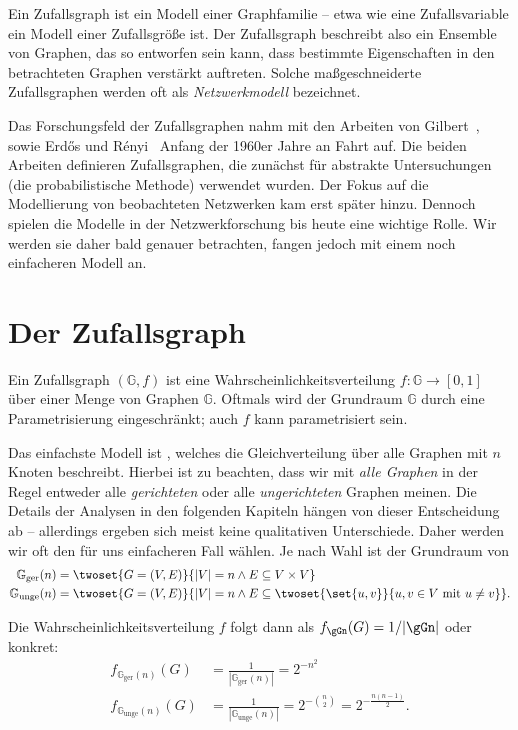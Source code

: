 Ein Zufallsgraph ist ein Modell einer Graphfamilie -- etwa wie eine Zufallsvariable ein Modell einer Zufallsgröße ist.
Der Zufallsgraph beschreibt also ein Ensemble von Graphen, das so entworfen sein kann, dass bestimmte Eigenschaften in den betrachteten Graphen verstärkt auftreten.
Solche maßgeschneiderte Zufallsgraphen werden oft als \emph{Netzwerkmodell} bezeichnet.

Das Forschungsfeld der Zufallsgraphen nahm mit den Arbeiten von Gilbert~\cite{gilbert_1959}, sowie Erd\H{o}s und R\'enyi~\cite{erdos_renyi_1960} Anfang der 1960er Jahre an Fahrt auf.
Die beiden Arbeiten definieren Zufallsgraphen, die zunächst für abstrakte Untersuchungen (\zB die probabilistische Methode) verwendet wurden.
Der Fokus auf die Modellierung von beobachteten Netzwerken kam erst später hinzu.
Dennoch spielen die Modelle in der Netzwerkforschung bis heute eine wichtige Rolle.
Wir werden sie daher bald genauer betrachten, fangen jedoch mit einem noch einfacheren Modell an.

\section{Der Zufallsgraph \Gn}
Ein Zufallsgraph $(\mathbb G, f)$ ist eine Wahrscheinlichkeitsverteilung $f\colon \mathbb G \to [0, 1]$ über einer Menge von Graphen $\mathbb G$.
Oftmals wird der Grundraum $\mathbb G$ durch eine Parametrisierung eingeschränkt; auch $f$ kann parametrisiert sein.

Das  einfachste Modell ist \Gn, welches die Gleichverteilung über alle Graphen mit $n$ Knoten beschreibt.
Hierbei ist zu beachten, dass wir mit \emph{alle Graphen} in der Regel entweder alle \emph{gerichteten} oder alle \emph{ungerichteten} Graphen meinen.
Die Details der Analysen in den folgenden Kapiteln hängen von dieser Entscheidung ab -- allerdings ergeben sich meist keine qualitativen Unterschiede.
Daher werden wir oft den für uns einfacheren Fall wählen.
Je nach Wahl ist der Grundraum von \Gn
\begin{align}
    \mathbb G_\text{ger}(n)  & =
    \twoset{G = (V,E)}{|V| = n \land E \subseteq V \times V} \\\label{eq:gerichtet_gn}
    \mathbb G_\text{unge}(n) & =
    \twoset{G = (V,E)}{|V| = n \land  E \subseteq \twoset{\set{u,v}}{u,v \in V \text{ mit } u \ne v}}.
\end{align}

\noindent Die Wahrscheinlichkeitsverteilung $f$ folgt dann als $f_{\gGn}(G) = 1 / | \gGn |$ oder konkret:
\begin{align}
    f_{\mathbb G_\text{ger}(n)}(G)  & =  \frac{1}{| \mathbb G_\text{ger}(n) |} = 2^{-n^2}\label{eq:gleichverteilt_gerichtet_gn} \\
    f_{\mathbb G_\text{unge}(n)}(G) & =  \frac{1}{| \mathbb G_\text{unge}(n) |} = 2^{-\binom n 2} = 2^{-\frac{n(n-1)}{2}}.
\end{align}

